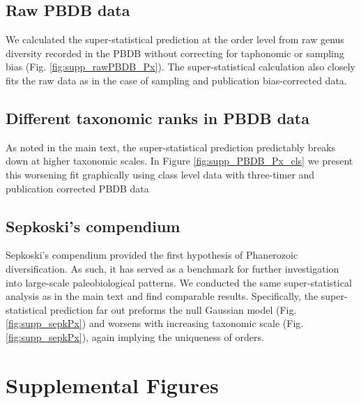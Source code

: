 \subsection{Raw PBDB data} \label{sec:rawPBDB}
We calculated the super-statistical prediction at the order level from
raw genus diversity recorded in the PBDB without correcting for
taphonomic or sampling bias (Fig. \ref{fig:supp_rawPBDB_Px}). The
super-statistical calculation also closely fits the raw data as in the
case of sampling and publication bias-corrected data.

\subsection{Different taxonomic ranks in PBDB data}
As noted in the main text, the super-statistical prediction
predictably breaks down at higher taxonomic scales. In Figure
\ref{fig:supp_PBDB_Px_cls} we present this worsening fit graphically
using class level data with three-timer and publication corrected PBDB
data

\subsection{Sepkoski's compendium} \label{sec:suppSepk}
Sepkoski's compendium \cite{sepkoski1992} provided the first
hypothesis of Phanerozoic diversification.  As such, it has served as
a benchmark for further investigation into large-scale paleobiological
patterns\cite{alroy08}.  We conducted the same super-statistical
analysis as in the main text and find comparable results.
Specifically, the super-statistical prediction far out preforms the
null Gaussian model (Fig. \ref{fig:supp_sepkPx}) and worsens with
increasing taxonomic scale (Fig. \ref{fig:supp_sepkPx}), again
implying the uniqueness of orders.

\printbibliography[heading=subbibliography]

\clearpage

\section*{Supplemental Figures}

